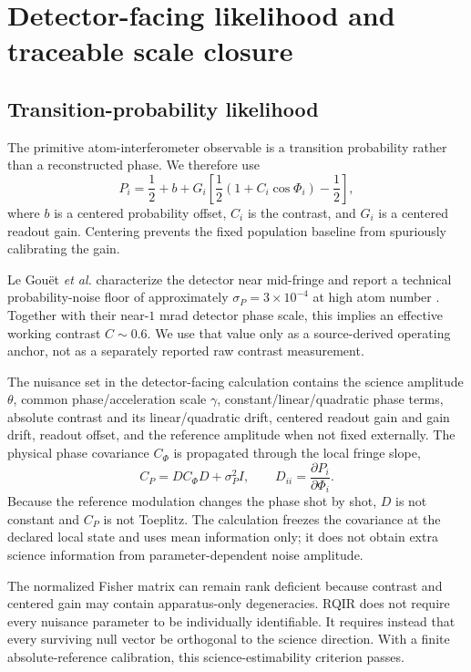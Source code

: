 \section{Detector-facing likelihood and traceable scale closure}
\label{sec:detector-reference}

\subsection{Transition-probability likelihood}

The primitive atom-interferometer observable is a transition probability rather than a reconstructed phase. We therefore use
\begin{equation}
P_i=\frac{1}{2}+b+G_i\left[\frac{1}{2}(1+C_i\cos\Phi_i)-\frac{1}{2}\right],
\label{eq:probability}
\end{equation}
where $b$ is a centered probability offset, $C_i$ is the contrast, and $G_i$ is a centered readout gain. Centering prevents the fixed population baseline from spuriously calibrating the gain.

Le Gou\"et \emph{et al.} characterize the detector near mid-fringe and report a technical probability-noise floor of approximately $\sigma_P=3\times10^{-4}$ at high atom number \cite{LeGouet2008}. Together with their near-$1$ mrad detector phase scale, this implies an effective working contrast $C\sim0.6$. We use that value only as a source-derived operating anchor, not as a separately reported raw contrast measurement.

The nuisance set in the detector-facing calculation contains the science amplitude $\theta$, common phase/acceleration scale $\gamma$, constant/linear/quadratic phase terms, absolute contrast and its linear/quadratic drift, centered readout gain and gain drift, readout offset, and the reference amplitude when not fixed externally. The physical phase covariance $C_\Phi$ is propagated through the local fringe slope,
\begin{equation}
C_P=D C_\Phi D+\sigma_P^2 I,
\qquad
D_{ii}=\frac{\partial P_i}{\partial\Phi_i}.
\label{eq:prob-cov}
\end{equation}
Because the reference modulation changes the phase shot by shot, $D$ is not constant and $C_P$ is not Toeplitz. The calculation freezes the covariance at the declared local state and uses mean information only; it does not obtain extra science information from parameter-dependent noise amplitude.

The normalized Fisher matrix can remain rank deficient because contrast and centered gain may contain apparatus-only degeneracies. RQIR does not require every nuisance parameter to be individually identifiable. It requires instead that every surviving null vector be orthogonal to the science direction. With a finite absolute-reference calibration, this science-estimability criterion passes.

